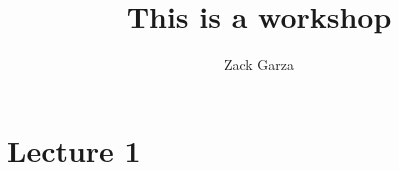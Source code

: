 \documentclass{memoir}
\title{This is a workshop}
\author{Zack Garza}
\begin{document}
\maketitle

\section{Lecture 1}


\end{document}

